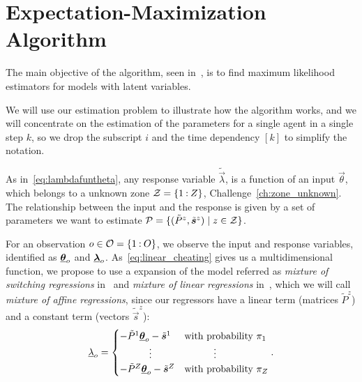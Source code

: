\documentclass{ifacconf}  %
\begin{document}
\section{Expectation-Maximization Algorithm}\label{sec:expect-maxim-algo}

The main objective of the \EM{} algorithm, seen in~\cite{DempsterEtAl1977}, is to find maximum likelihood estimators for models with latent variables.

We will use our estimation problem to illustrate how the algorithm works, and
we will concentrate on the estimation of the parameters for a single agent in a single step $k$, so we drop the subscript $i$ and the time dependency $[k]$ to simplify the notation.

As in~\eqref{eq:lambdafuntheta},  any response variable $\tilde{\vec{\lambda}}$, is a function of an input $\vec{\theta}$, which belongs to a unknown zone ${\mathcal{Z}=\{1\mathbin{:}Z\}}$, Challenge~\ref{ch:zone_unknown}.
The relationship between the input and the response is given by a set of parameters we want to estimate ${\mathcal{P}=\{(\tilde{P}^{z},\tilde{\boldsymbol{s}}^{z})\mid z\in\mathcal{Z}\}}$.

For an observation ${o\in\mathcal{O}=\{1\mathbin{:}O\}}$, we observe the input and response variables, identified as  ${\underline{\boldsymbol{\theta}}_{o}}$ and ${\underline{\boldsymbol{\lambda}}_{o}}$.
As~\eqref{eq:linear_cheating} gives us a multidimensional \pwa{} function, we propose to use a expansion of the model referred as \emph{mixture of switching regressions} in~\cite{QuandtRamsey1978} and \emph{mixture of linear regressions} in~\cite{FariaSoromenho2010}, which we will call \emph{mixture of affine regressions}, since our regressors have a linear term (matrices $\tilde{P}^{z}$) and a constant term (vectors $\tilde{\vec{s}}^{z}$):
\begin{equation}
  \label{eq:linear_cheating_random}
  \underline{\lambda}_{o}=
  \begin{cases}
    -\tilde{P}^{1}{\underline{\boldsymbol{\theta}}}_{o}-\tilde{\boldsymbol{s}}^{1}&\text{with probability}\ \pi_{1} \\
    \qquad\quad \vdots&\qquad\quad \vdots\\
    -\tilde{P}^{Z}{\underline{\boldsymbol{\theta}}}_{o}-\tilde{\boldsymbol{s}}^{Z}&\text{with probability}\ \pi_{Z} \\
  \end{cases}.
\end{equation}
\end{document}
